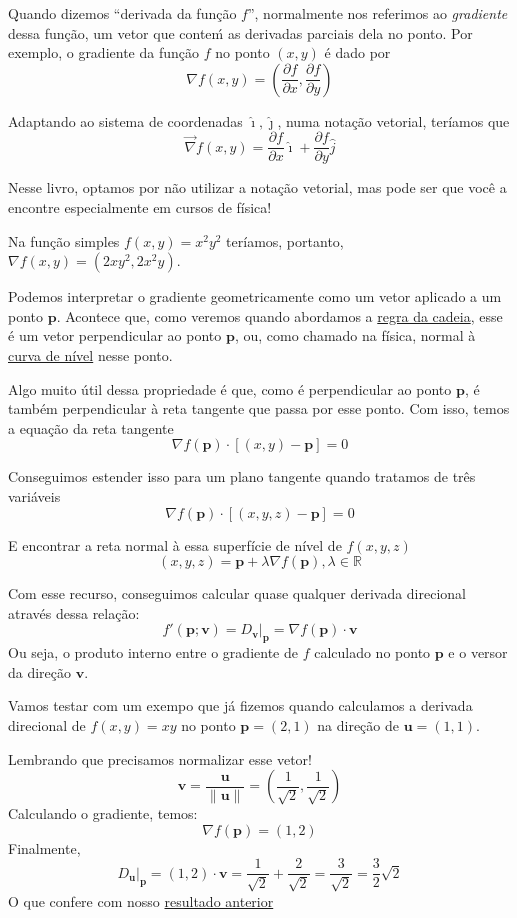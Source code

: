 \documentclass[
  portuguese,
  letterpaper,
  DIV=11,
  numbers=noendperiod]{scrreport}
\begin{document}
Quando dizemos ``derivada da função \(f\)'', normalmente nos referimos
ao \emph{gradiente} dessa função, um vetor que conteḿ as derivadas
parciais dela no ponto. Por exemplo, o gradiente da função \(f\) no
ponto \((x,y)\) é dado por \[
\nabla f(x,y) = \left(\frac{\partial f}{\partial x}, \frac{\partial f}{\partial y}\right)
\]

Adaptando ao sistema de coordenadas \(\hat{\imath}, \hat{\jmath}\), numa
notação vetorial, teríamos que \[
\vec{\nabla} f(x,y) = \frac{\partial f}{\partial x} \hat{\imath} +
\frac{\partial f}{\partial y} \hat{j}
\]

Nesse livro, optamos por não utilizar a notação vetorial, mas pode ser
que você a encontre especialmente em cursos de física!

Na função simples \(f(x,y) = x^2y^2\) teríamos, portanto,
\(\nabla f(x,y) = (2xy^2, 2x^2y)\).

Podemos interpretar o gradiente geometricamente como um vetor aplicado a
um ponto \(\pmb{p}\). Acontece que, como veremos quando abordamos a
\href{cadeia-tfi.qmd}{regra da cadeia}, esse é um vetor perpendicular ao
ponto \(\pmb{p}\), ou, como chamado na física, normal à
\hyperref[curvas]{curva de nível} nesse ponto.

Algo muito útil dessa propriedade é que, como é perpendicular ao ponto
\(\pmb{p}\), é também perpendicular à reta tangente que passa por esse
ponto. Com isso, temos a equação da reta tangente \[
\nabla f (\pmb{p}) \cdot [(x,y) - \pmb{p}] = 0
\]

Conseguimos estender isso para um plano tangente quando tratamos de três
variáveis \[
\nabla f (\pmb{p}) \cdot [(x,y,z) - \pmb{p}] = 0
\]

E encontrar a reta normal à essa superfície de nível de \(f(x,y,z)\) \[
(x,y,z) = \pmb{p} + \lambda \nabla f (\pmb{p}), \lambda \in \mathbb{R}
\]

Com esse recurso, conseguimos calcular quase qualquer derivada
direcional através dessa relação: \[
f'(\pmb{p}; \pmb{v}) = D_{\pmb{v}} \rvert_{\pmb{p}} =  \nabla f (\pmb{p}) \cdot \pmb{v}
\] Ou seja, o produto interno entre o gradiente de \(f\) calculado no
ponto \(\pmb{p}\) e o versor da direção \(\pmb{v}\).

Vamos testar com um exempo que já fizemos quando calculamos a derivada
direcional de \(f(x,y) = xy\) no ponto \(\pmb{p} = (2,1)\) na direção de
\(\pmb{u} = (1,1)\).

Lembrando que precisamos normalizar esse vetor! \[
\pmb{v} = \frac{\pmb{u}}{\lVert \pmb{u} \rVert} = \left(\frac{1}{\sqrt{2}}, \frac{1}{\sqrt{2}}\right)
\] Calculando o gradiente, temos: \[
\nabla f(\pmb{p}) = (1,2)
\] Finalmente, \[
D_{\pmb{u}}\rvert_{\pmb{p}} = (1,2) \cdot \pmb{v} = \frac{1}{\sqrt{2}}+\frac{2}{\sqrt{2}} = \frac{3}{\sqrt{2}} = \frac{3}{2} \sqrt{2}
\] O que confere com nosso
\hyperref[exercuxedcio---derivada-direcional]{resultado anterior}
\end{document}
